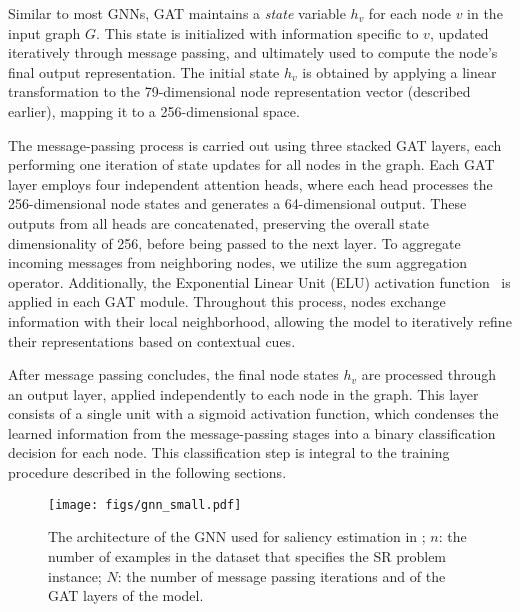 Similar to most GNNs, GAT maintains a \emph{state} variable $h_v$ for each node $v$ in the input graph $G$. This state is initialized with information specific to $v$, updated iteratively through message passing, and ultimately used to compute the node's final output representation. The initial state $h_v$ is obtained by applying a linear transformation to the 79-dimensional node representation vector (described earlier), mapping it to a 256-dimensional space.

The message-passing process is carried out using three stacked GAT layers, each performing one iteration of state updates for all nodes in the graph. Each GAT layer employs four independent attention heads, where each head processes the 256-dimensional node states and generates a 64-dimensional output. These outputs from all heads are concatenated, preserving the overall state dimensionality of 256, before being passed to the next layer. To aggregate incoming messages from neighboring nodes, we utilize the sum aggregation operator. Additionally, the Exponential Linear Unit (ELU) activation function~\cite{clevert2015fast} is applied in each GAT module. Throughout this process, nodes exchange information with their local neighborhood, allowing the model to iteratively refine their representations based on contextual cues.

After message passing concludes, the final node states $h_v$ are processed through an output layer, applied independently to each node in the graph. This layer consists of a single unit with a sigmoid activation function, which condenses the learned information from the message-passing stages into a binary classification decision for each node. This classification step is integral to the training procedure described in the following sections.






\begin{figure*}[t]
    \begin{center}
    \texttt{[image: figs/gnn\_small.pdf]}%
    \end{center}
    \caption{The architecture of the GNN used for saliency estimation in \mname; $n$: the number of examples in the dataset that specifies the SR problem instance; $N$: the number of message passing iterations and of the GAT layers of the model.}
    \label{fig:gnn}
\end{figure*}







